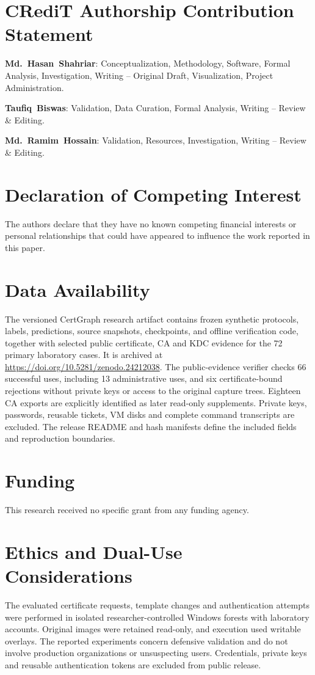 \section*{CRediT Authorship Contribution Statement}
\noindent\textbf{Md.~Hasan~Shahriar}: Conceptualization, Methodology, Software, Formal Analysis, Investigation, Writing -- Original Draft, Visualization, Project Administration.
\par\smallskip\noindent\textbf{Taufiq~Biswas}: Validation, Data Curation, Formal Analysis, Writing -- Review \& Editing.
\par\smallskip\noindent\textbf{Md.~Ramim~Hossain}: Validation, Resources, Investigation, Writing -- Review \& Editing.

\section*{Declaration of Competing Interest}
\noindent The authors declare that they have no known competing financial interests or personal relationships that could have appeared to influence the work reported in this paper.

\section*{Data Availability}
\noindent The versioned CertGraph research artifact contains frozen synthetic protocols, labels, predictions, source snapshots, checkpoints, and offline verification code, together with selected public certificate, CA and KDC evidence for the 72 primary laboratory cases. It is archived at \url{https://doi.org/10.5281/zenodo.24212038}. The public-evidence verifier checks 66 successful uses, including 13 administrative uses, and six certificate-bound rejections without private keys or access to the original capture trees. Eighteen CA exports are explicitly identified as later read-only supplements. Private keys, passwords, reusable tickets, VM disks and complete command transcripts are excluded. The release README and hash manifests define the included fields and reproduction boundaries.

\section*{Funding}
\noindent This research received no specific grant from any funding agency.

\section*{Ethics and Dual-Use Considerations}
\noindent The evaluated certificate requests, template changes and authentication attempts were performed in isolated researcher-controlled Windows forests with laboratory accounts. Original images were retained read-only, and execution used writable overlays. The reported experiments concern defensive validation and do not involve production organizations or unsuspecting users. Credentials, private keys and reusable authentication tokens are excluded from public release.
